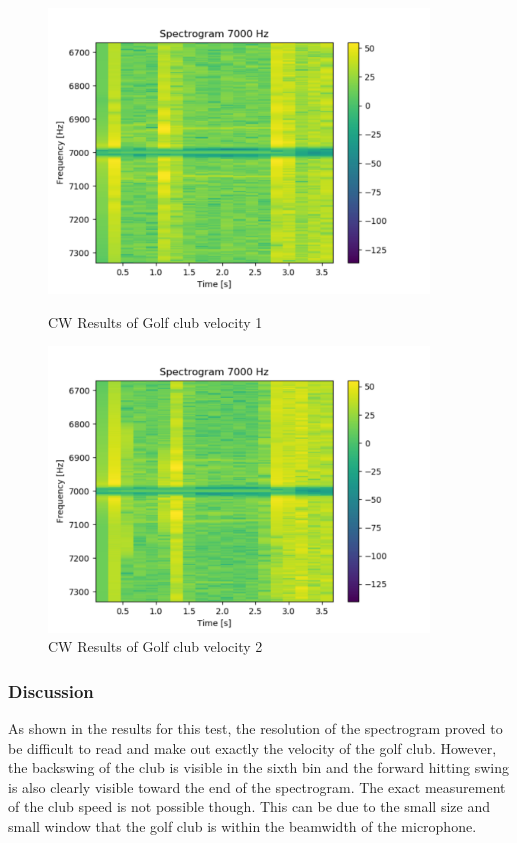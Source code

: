 \begin{figure}[h!]
    \centering
    \begin{minipage}{0.45\textwidth}
        \centering
        \includegraphics[width = 0.9\textwidth]{images/cw2results.pdf}
    \caption{CW Results of Golf club velocity 1}\label{fig:cw2results}
    \end{minipage}\hfill
    \begin{minipage}{0.45\textwidth}
        \centering
        \includegraphics[width=0.9\textwidth]{images/cw2results2.pdf}
        \caption{CW Results of Golf club velocity 2}\label{fig:cw2results2}
    \end{minipage}
\end{figure}

\subsubsection{Discussion}
As shown in the results for this test, the resolution of the spectrogram proved to be difficult to read and make out exactly the velocity of the golf club. However, the backswing of the club is visible in the sixth bin and the forward hitting swing is also clearly visible toward the end of the spectrogram. The exact measurement of the club speed is not possible though. This can be due to the small size and small window that the golf club is within the beamwidth of the microphone. 

